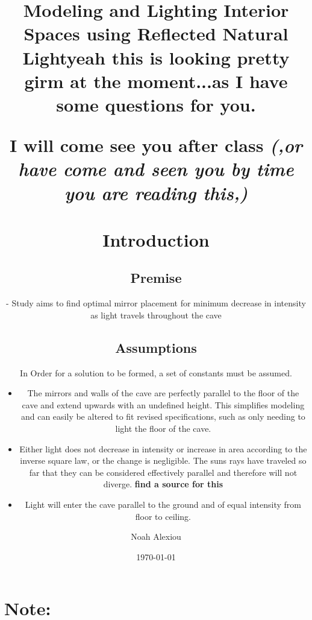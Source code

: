 \documentclass[11pt, letterpaper]{article}
\begin{document}
\title{Modeling and Lighting Interior Spaces using Reflected Natural Light}
\author{Noah Alexiou}
\date{\today}
\maketitle
\newpage
\tableofcontents
\newpage

\section{{\Huge {Note:}}}
\title{yeah this is looking pretty girm at the moment...}
\\
\title{I will come see you after class 
\textit{(,or have come and seen you by time you are reading this,)}
\title{as I have some questions for you.}

\section{Introduction}


\subsection{Premise}
- Study aims to find optimal mirror placement for minimum decrease in intensity as light travels throughout the cave




\subsection{Assumptions}
\par
In Order for a solution to be formed, a set of constants must be assumed.
\begin{itemize}
	\item The mirrors and walls of the cave are perfectly parallel to the floor of the cave and extend upwards with an undefined height. This simplifies modeling and can easily be altered to fit revised specifications, such as only needing to light the floor of the cave.
	
	\item Either light does not decrease in intensity or increase in area according to the inverse square law, or the change is negligible. The suns rays have traveled so far that they can be considered effectively parallel and therefore will not diverge. 
	\textbf{find a source for this}
		
	\item Light will enter the cave parallel to the ground and of equal intensity from floor to ceiling.
	

\end{itemize}}
\end{document}
